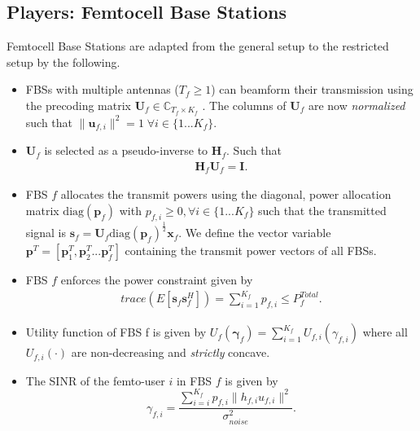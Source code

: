 \documentclass[12pt,a4paper]{report}
\begin{document}
\subsection{Players: Femtocell Base Stations}\label{conmodel_fbs}
Femtocell Base Stations are adapted from the general setup to the restricted setup by the following.
\begin{itemize}
\item 
	FBSs with multiple antennas ($T_f \geq 1$) can beamform their transmission using the precoding 	
	matrix $\mathbf{U}_{f} \in \mathbb{C}_{T_{f} \times K_{f}}$ .
	The columns of $\mathbf{U}_{f}$ are now \emph{normalized} such that 
	 $\|\mathbf{u}_{f,i}\|^2 =1 \;\forall i \in \{1 ... K_{f}\}$.
\\

\item 
$\mathbf{U}_f$ is selected as a pseudo-inverse to $\mathbf{H}_f$.
Such that
\begin{gather*}
\mathbf{H}_{f}  \mathbf{U}_{f} = \mathbf{I}.
\end{gather*} 


\item  
	FBS $f$ allocates the transmit powers using the diagonal, power allocation  	
	matrix $\mathrm{diag}(\mathbf{p}_{f})$ with $p_{f,i} \geq 0, \forall i \in \{1 ... K_{f}\}$
such that the transmitted 		
	signal is 
	$\mathbf{s}_{f	}= \mathbf{U}_{f} 
	\mathrm{diag}(\mathbf{p}_{f})^{\frac{1}{2}}
	\mathbf{x}_{f}$. We define the vector variable $\mathbf{p}^T= [\mathbf{p}_1^T, \mathbf{p}_2^T...\mathbf{p}_{f}^T]$ containing the transmit power vectors of all FBSs.
\\
\item 
	FBS $f$ enforces the power constraint given by
	\begin{gather*}
	trace(E[\mathbf{s}_f\mathbf{s}_f^H]) =
	\sum_{i=1}^{K_{f}} p_{f,i}
	  \leq P^{Total}_{f}.
	  	\end{gather*}




\item 
	Utility function of FBS f is given by $U_{f}(\boldsymbol{\gamma}_f) =
	\sum_{i=1}^{K_{f}}
    	U_{f,i}(\gamma_{f,i}) $
    	where all $U_{f,i}(\cdot)$ are non-decreasing and
    	\emph{strictly} concave.
\item The SINR of the femto-user $i$ in FBS $f$ is given by
\begin{equation}\label{zf_snr}
	\gamma_{f,i} =\frac{\sum_{i=i}^{K_{f}}
 p_{f,i}\|h_{f,i}u_{f,i}\|^2}
	{\sigma^2_{noise}  
	}.
	\end{equation}

\end{itemize}
\end{document}
